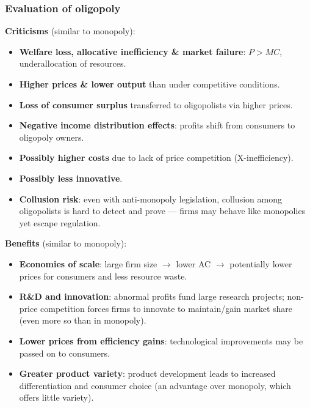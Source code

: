 \documentclass[a4paper,12pt]{article}
\begin{document}
\subsubsection*{Evaluation of oligopoly}
\textbf{Criticisms} (similar to monopoly):
\begin{itemize}
  \item \textbf{Welfare loss, allocative inefficiency \& market failure}: $P > MC$, underallocation of resources.
  \item \textbf{Higher prices \& lower output} than under competitive conditions.
  \item \textbf{Loss of consumer surplus} transferred to oligopolists via higher prices.
  \item \textbf{Negative income distribution effects}: profits shift from consumers to oligopoly owners.
  \item \textbf{Possibly higher costs} due to lack of price competition (X-inefficiency).
  \item \textbf{Possibly less innovative}.
  \item \textbf{Collusion risk}: even with anti-monopoly legislation, collusion among oligopolists is hard to detect and prove --- firms may behave like monopolies yet escape regulation.
\end{itemize}
\textbf{Benefits} (similar to monopoly):
\begin{itemize}
  \item \textbf{Economies of scale}: large firm size $\to$ lower AC $\to$ potentially lower prices for consumers and less resource waste.
  \item \textbf{R\&D and innovation}: abnormal profits fund large research projects; non-price competition forces firms to innovate to maintain/gain market share (even more so than in monopoly).
  \item \textbf{Lower prices from efficiency gains}: technological improvements may be passed on to consumers.
  \item \textbf{Greater product variety}: product development leads to increased differentiation and consumer choice (an advantage over monopoly, which offers little variety).
\end{itemize}
\end{document}
